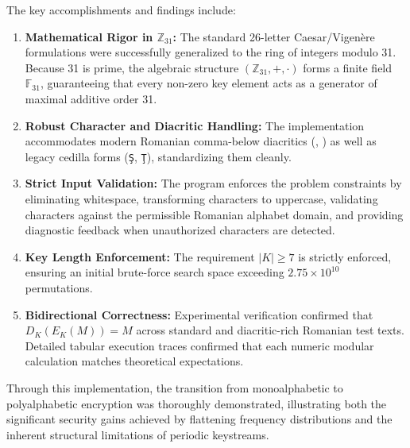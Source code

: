 \documentclass[11pt,a4paper]{article}
\begin{document}
The key accomplishments and findings include:
\begin{enumerate}
  \item \textbf{Mathematical Rigor in $\mathbb{Z}_{31}$:} The standard 26-letter Caesar/Vigen\`ere formulations were successfully generalized to the ring of integers modulo 31. Because 31 is prime, the algebraic structure $(\mathbb{Z}_{31}, +, \cdot)$ forms a finite field $\mathbb{F}_{31}$, guaranteeing that every non-zero key element acts as a generator of maximal additive order 31.
  \item \textbf{Robust Character and Diacritic Handling:} The implementation accommodates modern Romanian comma-below diacritics (\texttt{}, \texttt{}) as well as legacy cedilla forms (\texttt{\c{S}}, \texttt{\c{T}}), standardizing them cleanly.
  \item \textbf{Strict Input Validation:} The program enforces the problem constraints by eliminating whitespace, transforming characters to uppercase, validating characters against the permissible Romanian alphabet domain, and providing diagnostic feedback when unauthorized characters are detected.
  \item \textbf{Key Length Enforcement:} The requirement $|K| \ge 7$ is strictly enforced, ensuring an initial brute-force search space exceeding $2.75 \times 10^{10}$ permutations.
  \item \textbf{Bidirectional Correctness:} Experimental verification confirmed that $D_K(E_K(M)) = M$ across standard and diacritic-rich Romanian test texts. Detailed tabular execution traces confirmed that each numeric modular calculation matches theoretical expectations.
\end{enumerate}

Through this implementation, the transition from monoalphabetic to polyalphabetic encryption was thoroughly demonstrated, illustrating both the significant security gains achieved by flattening frequency distributions and the inherent structural limitations of periodic keystreams.
\end{document}

